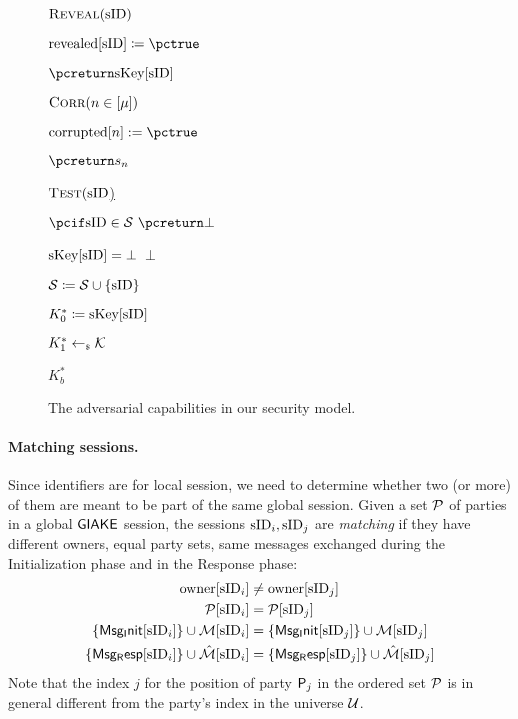 \begin{figure}[h!]
{{\begin{minipage}[t]{0.4\textwidth}
\underline{$\RevealO(\sID)$}
\begin{nicodemus}
	\item $\revealed[\sID] \coloneqq \pctrue$
	\item $\pcreturn \skeys[\sID]$	\\	
\end{nicodemus}

\underline{$\CorruptO(n \in [\mu])$}
\begin{nicodemus}
	\item $\corrupted[n] := \pctrue$
	\item $\pcreturn \ssk_n$\\
\end{nicodemus}

\underline{$\TestO(\sID$)}
\begin{nicodemus}
	\item $\pcif \sid\in\testSessions~ \pcreturn \bot$ 
	\item \pcif $\skeys[\sID] = \bot$~\pcreturn $\bot$
	\item $\testSessions \coloneqq \testSessions \cup \{\sid\}$
	\item $K_0^* \coloneqq \skeys[\sID]$
	\item $K_1^* \getsr \mathcal{K}$
	\item \pcreturn $K_b^*$
\end{nicodemus}
\end{minipage}
	}}
	\caption{The adversarial capabilities in our security model.}
	\label{fig:giake-adversary}
\end{figure}

\paragraph{Matching sessions.} Since identifiers are for local session, we need to determine whether two (or more) of them are meant to be part of the same global session. 
Given a set $\PartySet$ of parties in a global $\GIAKE$ session, the sessions $\sid_{i}, \sid_j$ are \textit{matching} if they have different owners, equal party sets, same messages exchanged during the Initialization phase and in the Response phase:
	\begin{align*}
		\owner[\sID_{i}] &\neq \owner[\sID_j] \\
		\GakeUSet[\sID_{i}] &= \GakeUSet[\sID_j]  \\
		\changehighlight{\{\GIniMes[\sID_{i}]\}} \cup \GIniMesSet[\sID_{i}] &= \changehighlight{\{\GIniMes[\sID_j]\}} \cup \GIniMesSet[\sID_j]   \\
		\changehighlight{\{\GResMes[\sID_{i}]\}} \cup \GResMesSet[\sID_{i}] &= \changehighlight{\{\GResMes[\sID_j]\}}\cup \GResMesSet[\sID_j]  
	\end{align*}
Note that the index $j$ for the position of party $\User[j]$ in the ordered set $\PartySet$ is in general different from the party's index in the universe $\Universe$.


